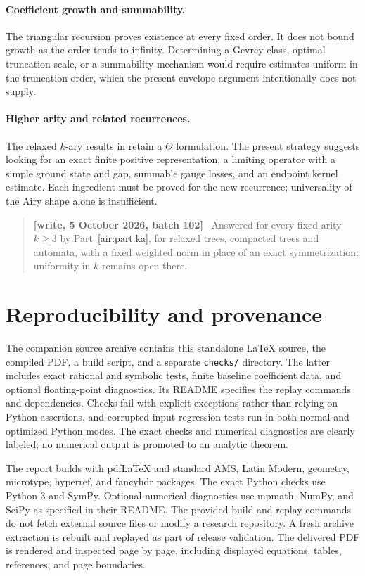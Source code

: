 \documentclass[11pt,letterpaper]{article}
\numberwithin{equation}{section}
\theoremstyle{remark}
\newenvironment{writenotejp}{\par\smallskip\begin{quote}\small\textbf{[write, 5 October 2026, batch 102]}\ }{\end{quote}\smallskip}
\begin{document}
\paragraph{Coefficient growth and summability.}
The triangular recursion proves existence at every fixed order. It does not bound growth as the order tends to infinity. Determining a Gevrey class, optimal truncation scale, or a summability mechanism would require estimates uniform in the truncation order, which the present envelope argument intentionally does not supply.

\paragraph{Higher arity and related recurrences.}
The relaxed $k$-ary results in \cite{gdw} retain a $\Theta$ formulation. The present strategy suggests looking for an exact finite positive representation, a limiting operator with a simple ground state and gap, summable gauge losses, and an endpoint kernel estimate. Each ingredient must be proved for the new recurrence; universality of the Airy shape alone is insufficient.
\begin{writenotejp}
Answered for every fixed arity $k\ge3$ by Part~\ref{air:part:ka}, for relaxed trees, compacted trees and automata, with a fixed weighted norm in place of an exact symmetrization; uniformity in $k$ remains open there.
\end{writenotejp}

\section{Reproducibility and provenance}\label{air:jp:rb:sec:reproduce}

The companion source archive contains this standalone \LaTeX{} source, the compiled PDF, a build script, and a separate \texttt{checks/} directory. The latter includes exact rational and symbolic tests, finite baseline coefficient data, and optional floating-point diagnostics. Its README specifies the replay commands and dependencies. Checks fail with explicit exceptions rather than relying on Python assertions, and corrupted-input regression tests run in both normal and optimized Python modes. The exact checks and numerical diagnostics are clearly labeled; no numerical output is promoted to an analytic theorem.

The report builds with pdf\LaTeX{} and standard AMS, Latin Modern, geometry, microtype, hyperref, and fancyhdr packages. The exact Python checks use Python 3 and SymPy. Optional numerical diagnostics use mpmath, NumPy, and SciPy as specified in their README. The provided build and replay commands do not fetch external source files or modify a research repository. A fresh archive extraction is rebuilt and replayed as part of release validation. The delivered PDF is rendered and inspected page by page, including displayed equations, tables, references, and page boundaries.
\end{document}
